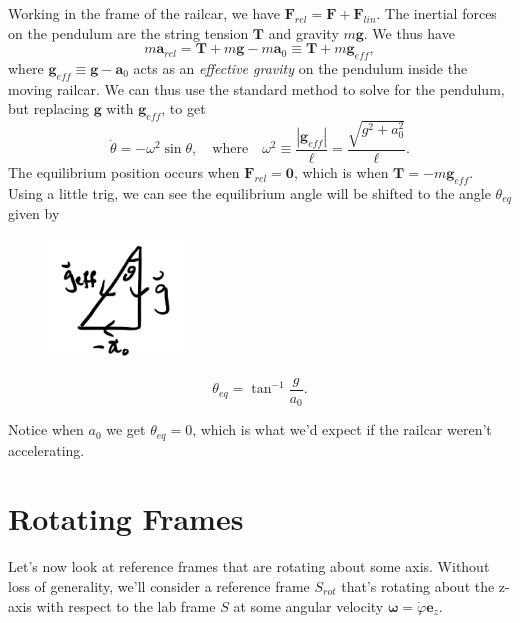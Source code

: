 \documentclass[
  letterpaper,
  DIV=11,
  numbers=noendperiod]{scrreprt}
\begin{document}
Working in the frame of the railcar, we have
\(\mathbf{F}_{rel} = \mathbf{F} + \mathbf{F}_{lin}\). The inertial
forces on the pendulum are the string tension \(\mathbf{T}\) and gravity
\(m\mathbf{g}\). We thus have \[
m\mathbf{a}_{rel} = \mathbf{T} + m\mathbf{g} - m\mathbf{a}_0 \equiv \mathbf{T} + m\mathbf{g}_{eff},
\] where \(\mathbf{g}_{eff} \equiv \mathbf{g} - \mathbf{a}_0\) acts as
an \emph{effective gravity} on the pendulum inside the moving railcar.
We can thus use the standard method to solve for the pendulum, but
replacing \(\mathbf{g}\) with \(\mathbf{g}_{eff}\), to get \[
\ddot \theta = -\omega^2 \sin \theta, \quad \text{where} \quad \omega^2 \equiv \frac{|\mathbf{g}_{eff}|}{\ell} = \frac{\sqrt{g^2 + a_0^2}}{\ell}.
\] The equilibrium position occurs when \(\mathbf{F}_{rel}=\mathbf{0}\),
which is when \(\mathbf{T} = -m\mathbf{g}_{eff}\). Using a little trig,
we can see the equilibrium angle will be shifted to the angle
\(\theta_{eq}\) given by

\begin{figure}

{\centering \includegraphics[width=1.45833in,height=\textheight]{classical-mechanics/./resources/image-20230217110859846.png}

}

\end{figure}

\[
\theta_{eq} = \tan^{-1} \frac{g}{a_0}.
\]

Notice when \(a_0\) we get \(\theta_{eq}=0\), which is what we'd expect
if the railcar weren't accelerating.

\hypertarget{rotating-frames}{%
\section{Rotating Frames}\label{rotating-frames}}

Let's now look at reference frames that are rotating about some axis.
Without loss of generality, we'll consider a reference frame \(S_{rot}\)
that's rotating about the z-axis with respect to the lab frame \(S\) at
some angular velocity
\(\boldsymbol{\omega} = \dot \varphi \mathbf{e}_z\).
\end{document}
